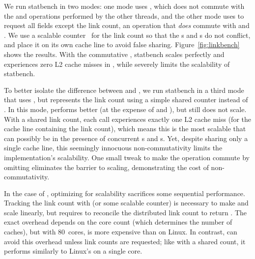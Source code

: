 %   

We run statbench in two modes: one mode uses , which does
not commute with the  and  operations performed
by the other threads, and the other mode uses  to request
all fields except the link count, an operation that \emph{does} commute
with  and .  We use a  scalable
counter~\cite{clements:radixvm} for the link count so that the
s and s do not conflict, and place it on
its own cache line to avoid false sharing.
Figure~\ref{fig:linkbench} shows the results.  With the commutative
, statbench scales perfectly and experiences zero L2 cache
misses in , while  severely limits the
scalability of statbench.  

To better
isolate the difference between  and , we run
statbench in a
third mode that uses , but represents the link count
using a simple shared counter instead of .  In this mode, 
performs better (at the expense of  and ), but
still does not scale.  With a shared link count, each 
call experiences exactly one L2 cache miss (for the cache line
containing the link count), which means this is the most scalable that
 can possibly be in the presence of concurrent s
and s.  Yet, despite sharing only a single cache line, this
seemingly innocuous non-commutativity limits the
implementation's scalability.  One small tweak to make the operation
commute by omitting  eliminates the barrier to scaling,
demonstrating the cost of non-commutativity.

In the case of , optimizing for scalability sacrifices some
sequential performance.  Tracking the link count with 
(or some scalable counter) is necessary to make  and
 scale linearly, but requires  to reconcile the
distributed link count to return .  The exact overhead
depends on the core count (which determines the number of 
caches), but with 80~cores,  is 
more expensive than on Linux.  
In contrast,  can avoid this overhead unless link counts are
requested; like  with a shared count, it performs similarly to Linux's  on
a single core.

